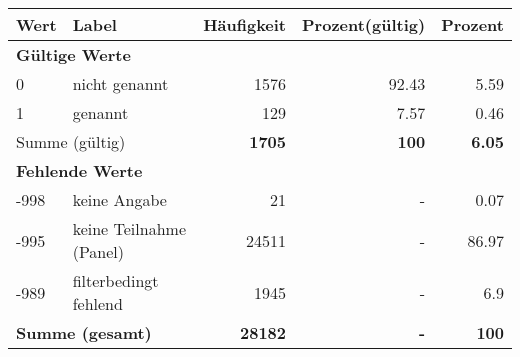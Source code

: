      \begin{longtable}{lXrrr}
     \toprule
     \textbf{Wert} & \textbf{Label} & \textbf{Häufigkeit} & \textbf{Prozent(gültig)} & \textbf{Prozent} \\
     \endhead
     \midrule
     \multicolumn{5}{l}{\textbf{Gültige Werte}}\\

     0 &
     \multicolumn{1}{X}{ nicht genannt   } &


       \num{1576} &
       \num[round-mode=places,round-precision=2]{92.43} &
         \num[round-mode=places,round-precision=2]{5.59} \\

     1 &
     \multicolumn{1}{X}{ genannt   } &


       \num{129} &
       \num[round-mode=places,round-precision=2]{7.57} &
         \num[round-mode=places,round-precision=2]{0.46} \\
     \midrule
     \multicolumn{2}{l}{Summe (gültig)} &
       \textbf{\num{1705}} &
     \textbf{100} &
       \textbf{\num[round-mode=places,round-precision=2]{6.05}} \\
     \multicolumn{5}{l}{\textbf{Fehlende Werte}}\\
       -998 &
       keine Angabe &
         \num{21} &
        - &
         \num[round-mode=places,round-precision=2]{0.07} \\
       -995 &
       keine Teilnahme (Panel) &
         \num{24511} &
        - &
         \num[round-mode=places,round-precision=2]{86.97} \\
       -989 &
       filterbedingt fehlend &
         \num{1945} &
        - &
         \num[round-mode=places,round-precision=2]{6.9} \\
     \midrule
     \multicolumn{2}{l}{\textbf{Summe (gesamt)}} &
          \textbf{\num{28182}} &
        \textbf{-} &
        \textbf{100} \\
     \bottomrule
     \end{longtable}
     
